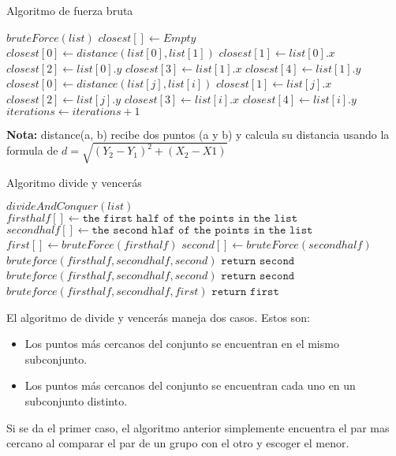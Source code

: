\begin{algorithm}[h!]
\caption{Algoritmo de fuerza bruta}
\begin{algorithmic}
\State $bruteForce(list)$
    \State $closest[] \gets Empty$
    \State $closest[0] \gets distance(list[0], list[1])$
    \State $closest[1] \gets list[0].x$
    \State $closest[2] \gets list[0].y$
    \State $closest[3] \gets list[1].x$
    \State $closest[4] \gets list[1].y$
            \State $closest[0] \gets distance(list[j], list[i])$
            \State $ closest[1] \gets list[j].x$
            \State $ closest[2] \gets list[j].y$
            \State $ closest[3] \gets list[i].x$
            \State $ closest[4] \gets list[i].y$
        \EndIf
        \EndFor
        \State $ iterations \gets iterations + 1$
    \EndFor
\end{algorithmic}    
\end{algorithm}
\textbf{Nota:} distance(a, b) recibe dos puntos (a y b) y calcula su distancia usando la formula de $d =\sqrt{(Y_2-Y_1)^2+(X_2-X1)}$\\
\begin{algorithm}[h!]
\caption{Algoritmo divide y vencerás}
\begin{algorithmic}
\State $divideAndConquer(list)$
    \State $ firsthalf[] \gets \texttt{the first half of the points in the list}$
    \State $ secondhalf[] \gets \texttt{the second hlaf of the points in the list}$
    \State $ first[] \gets bruteForce(firsthalf)$
    \State $ second[] \gets bruteForce(secondhalf)$
        \State $bruteforce(firsthalf, secondhalf,second)$
        \State $\texttt{return second}$
    \Else
            \State $bruteforce(firsthalf, secondhalf,second)$
            \State $\texttt{return second}$
        \Else
            \State $bruteforce(firsthalf, secondhalf,first)$
            \State $\texttt{return first}$
         \EndIf
    \EndIf
\end{algorithmic}    
\end{algorithm}
\FloatBarrier
El algoritmo de divide y vencerás maneja dos casos. Estos son:
\begin{itemize}
    \item 
    Los puntos más cercanos del conjunto se encuentran en el mismo subconjunto.
    \item
    Los puntos más cercanos del conjunto se encuentran cada uno en un subconjunto distinto.
\end{itemize}
Si se da el primer caso, el algoritmo anterior simplemente encuentra el par mas cercano al comparar el par de un grupo con el otro y escoger el menor.\\

